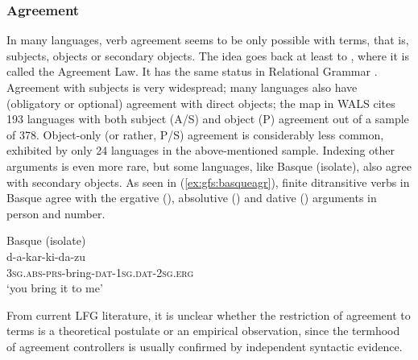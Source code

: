 \documentclass[output=paper]{../langscibook}
\begin{document}
 \subsubsection{Agreement} In many languages, verb agreement seems to be only possible with terms, that is, subjects, objects or secondary objects. The idea goes back at least to \citet[157]{johnson1977}, where it is called the Agreement Law. It has the same status in Relational Grammar \citep{frantz1981}. Agreement with subjects is very widespread; many languages also have (obligatory or optional) agreement with direct objects; the map in WALS \citep{siewerska2013} cites 193 languages with both subject (A/S) and object (P) agreement out of a sample of 378. Object-only (or rather, P/S) agreement is considerably less common, exhibited by only 24 languages in the above-mentioned sample.  Indexing other arguments is even more rare, but some languages, like Basque (isolate), also agree with secondary objects. As seen in (\ref{ex:gfs:basqueagr}), finite ditransitive verbs in Basque agree with the ergative (\SUBJ), absolutive (\OBJ) and dative ({\OBJTHETA}) arguments in person and number.
 
 \ea\label{ex:gfs:basqueagr}
 Basque (isolate)\\
 \gll d-a-kar-ki-da-zu\\
 \textsc{3sg.abs-prs}-bring-\textsc{dat-1sg.dat-2sg.erg}\\
 \trans `you bring it to me' \citep[209]{hualde-etal2003}\\
 \z
 

 From current LFG literature, it is unclear whether the restriction of agreement to terms is a theoretical postulate or an empirical observation, since the termhood of agreement controllers is usually confirmed by independent syntactic evidence.
 
\end{document}
